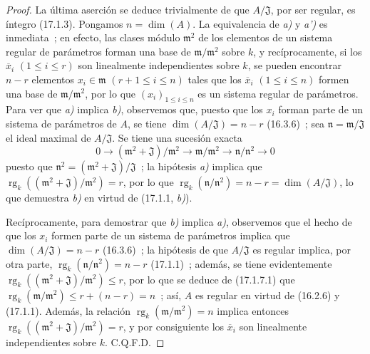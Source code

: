 \begin{proof}
La última aserción se deduce trivialmente de que $A/\mathfrak{J}$,
por ser regular, es íntegro (17.1.3). Pongamos $n=\dim(A)$. La equivalencia de \emph{a)}
y \emph{a')} es inmediata~; en efecto, las clases módulo $\mathfrak{m}^2$ de los elementos
de un sistema regular de parámetros forman una base de
$\mathfrak{m}/\mathfrak{m}^2$ sobre $k$, y recíprocamente, si los
$\overline{x}_i$ $(1\leq i\leq r)$ son linealmente independientes sobre $k$, se
pueden encontrar $n-r$ elementos $x_i\in\mathfrak{m}$ $(r+1\leq i\leq n)$ tales que
los $\overline{x}_i$ $(1\leq i\leq n)$ formen una base de
$\mathfrak{m}/\mathfrak{m}^2$, por lo que $(x_i)_{1\leq i\leq n}$ es un sistema
regular de parámetros. Para ver que \emph{a)} implica \emph{b)}, observemos que, puesto que
los $x_i$ forman parte de un sistema de parámetros de $A$, se tiene
$\dim(A/\mathfrak{J})=n-r$ (16.3.6)~; sea
$\mathfrak{n}=\mathfrak{m}/\mathfrak{J}$ el ideal maximal de
$A/\mathfrak{J}$. Se tiene una sucesión exacta
\begin{equation}
\label{0.17.1.7.1-fr}
\tag{17.1.7.1}
  0\longrightarrow(\mathfrak{m}^2+\mathfrak{J})/\mathfrak{m}^2
  \longrightarrow\mathfrak{m}/\mathfrak{m}^2
  \longrightarrow\mathfrak{n}/\mathfrak{n}^2\longrightarrow0
\end{equation}
puesto que $\mathfrak{n}^2=(\mathfrak{m}^2+\mathfrak{J})/\mathfrak{J}$~;
la hipótesis \emph{a)} implica que
$\operatorname{rg}_k((\mathfrak{m}^2+\mathfrak{J})/\mathfrak{m}^2)=r$, por lo que
$\operatorname{rg}_k(\mathfrak{n}/\mathfrak{n}^2)=n-r
=\dim(A/\mathfrak{J})$, lo que demuestra \emph{b)} en virtud de (17.1.1, \emph{b)}).

Recíprocamente, para demostrar que \emph{b)} implica \emph{a)}, observemos que el hecho de que los $x_i$
formen parte de un sistema de parámetros implica que
$\dim(A/\mathfrak{J})=n-r$ (16.3.6)~; la hipótesis de que $A/\mathfrak{J}$ es
regular implica, por otra parte,
$\operatorname{rg}_k(\mathfrak{n}/\mathfrak{n}^2)=n-r$ (17.1.1)~; además,
se tiene evidentemente
$\operatorname{rg}_k((\mathfrak{m}^2+\mathfrak{J})/\mathfrak{m}^2)\leq r$,
por lo que se deduce de (17.1.7.1) que
$\operatorname{rg}_k(\mathfrak{m}/\mathfrak{m}^2)\leq r+(n-r)=n$~; así, $A$
es regular en virtud de (16.2.6) y (17.1.1). Además, la relación
$\operatorname{rg}_k(\mathfrak{m}/\mathfrak{m}^2)=n$ implica entonces
$\operatorname{rg}_k((\mathfrak{m}^2+\mathfrak{J})/\mathfrak{m}^2)=r$, y por
consiguiente los $\overline{x}_i$ son linealmente independientes sobre $k$. C.Q.F.D.
\end{proof}

